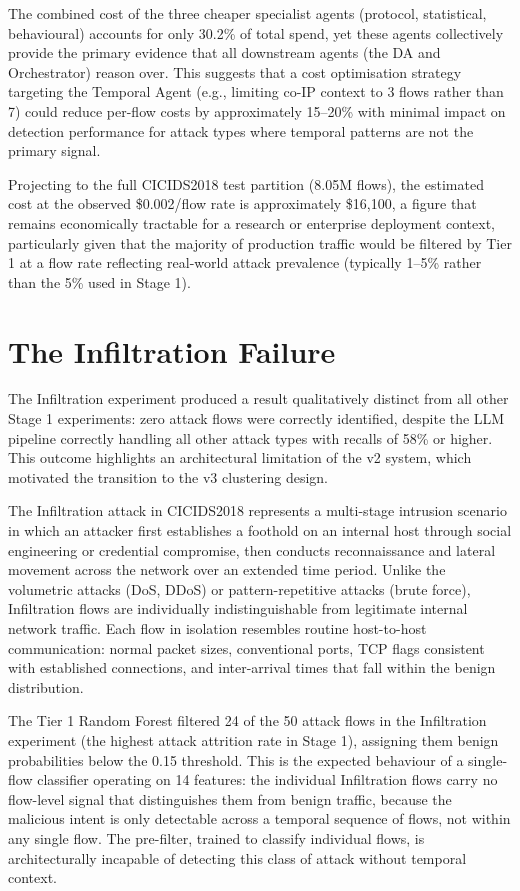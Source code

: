 \documentclass[../main.tex]{subfiles}
\begin{document}
The combined cost of the three cheaper specialist agents (protocol, statistical, behavioural) accounts for only 30.2\% of total spend, yet these agents collectively provide the primary evidence that all downstream agents (the DA and Orchestrator) reason over. This suggests that a cost optimisation strategy targeting the Temporal Agent (e.g., limiting co-IP context to 3 flows rather than 7) could reduce per-flow costs by approximately 15--20\% with minimal impact on detection performance for attack types where temporal patterns are not the primary signal.

Projecting to the full CICIDS2018 test partition (8.05M flows), the estimated cost at the observed \$0.002/flow rate is approximately \$16,100, a figure that remains economically tractable for a research or enterprise deployment context, particularly given that the majority of production traffic would be filtered by Tier 1 at a flow rate reflecting real-world attack prevalence (typically 1--5\% rather than the 5\% used in Stage 1).

\section{The Infiltration Failure}
\label{sec:infiltration-failure}

The Infiltration experiment produced a result qualitatively distinct from all other Stage 1 experiments: zero attack flows were correctly identified, despite the LLM pipeline correctly handling all other attack types with recalls of 58\% or higher. This outcome highlights an architectural limitation of the v2 system, which motivated the transition to the v3 clustering design.

The Infiltration attack in CICIDS2018 represents a multi-stage intrusion scenario in which an attacker first establishes a foothold on an internal host through social engineering or credential compromise, then conducts reconnaissance and lateral movement across the network over an extended time period. Unlike the volumetric attacks (DoS, DDoS) or pattern-repetitive attacks (brute force), Infiltration flows are individually indistinguishable from legitimate internal network traffic. Each flow in isolation resembles routine host-to-host communication: normal packet sizes, conventional ports, TCP flags consistent with established connections, and inter-arrival times that fall within the benign distribution.

The Tier 1 Random Forest filtered 24 of the 50 attack flows in the Infiltration experiment (the highest attack attrition rate in Stage 1), assigning them benign probabilities below the 0.15 threshold. This is the expected behaviour of a single-flow classifier operating on 14 features: the individual Infiltration flows carry no flow-level signal that distinguishes them from benign traffic, because the malicious intent is only detectable across a temporal sequence of flows, not within any single flow. The pre-filter, trained to classify individual flows, is architecturally incapable of detecting this class of attack without temporal context.
\end{document}

